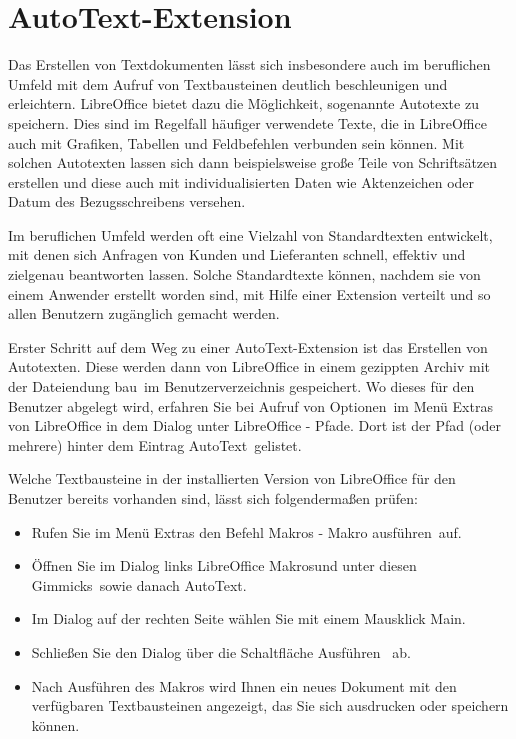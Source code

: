 \documentclass[12pt,a4paper,titlepage]{book}
\begin{document}
\section{AutoText-Extension}

Das Erstellen von Textdokumenten lässt sich insbesondere auch im beruflichen Umfeld mit dem Aufruf von Textbausteinen deutlich beschleunigen und erleichtern. LibreOffice bietet dazu die Möglichkeit, sogenannte Autotexte zu speichern. Dies sind im Regelfall häufiger verwendete Texte, die in LibreOffice auch mit Grafiken, Tabellen und Feldbefehlen verbunden sein können. Mit solchen Autotexten lassen sich dann beispielsweise große Teile von Schriftsätzen erstellen und diese auch mit individualisierten Daten wie Aktenzeichen oder Datum des Bezugsschreibens versehen.

Im beruflichen Umfeld werden oft eine Vielzahl von Standardtexten entwickelt, mit denen sich Anfragen von Kunden und Lieferanten schnell, effektiv und zielgenau beantworten lassen. Solche Standardtexte können, nachdem sie von einem Anwender erstellt worden sind, mit Hilfe einer Extension verteilt und so allen Benutzern zugänglich gemacht werden.

Erster Schritt auf dem Weg zu einer AutoText-Extension ist das Erstellen von Autotexten. Diese werden dann von LibreOffice in einem gezippten Archiv mit der Dateiendung \glqq bau\grqq~im Benutzerverzeichnis gespeichert. Wo dieses für den Benutzer abgelegt wird, erfahren Sie bei Aufruf von \glqq Optionen\grqq~im Menü Extras von LibreOffice in dem Dialog unter \glqq LibreOffice - Pfade\grqq. Dort ist der Pfad (oder mehrere) hinter dem Eintrag \glqq AutoText\grqq~gelistet.

Welche Textbausteine in der installierten Version von LibreOffice für den Benutzer bereits vorhanden sind, lässt sich folgendermaßen prüfen:
\begin{itemize}
	\item Rufen Sie im Menü Extras den Befehl \glqq Makros - Makro ausführen\grqq~auf.
	\item Öffnen Sie im Dialog links \glqq LibreOffice Makros\grqq und unter diesen \glqq Gimmicks\grqq~sowie danach \glqq AutoText\grqq.
	\item Im Dialog auf der rechten Seite wählen Sie mit einem Mausklick \glqq Main\grqq.
	\item Schließen Sie den Dialog über die Schaltfläche \glqq Ausführen\grqq~ ab.
	\item Nach Ausführen des Makros wird Ihnen ein neues Dokument mit den verfügbaren Textbausteinen angezeigt, das Sie sich ausdrucken oder speichern können.
\end{itemize}
\end{document}
